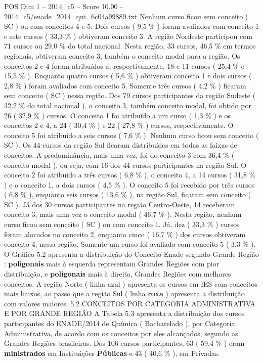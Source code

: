 \begin{textsample}{POS Dim 1 – 2014\_c5 – Score 10.00 – 2014\_c5/enade\_2014\_qui\_6c04a99889.txt}
Nenhum curso ficou sem conceito ( SC ) ou com conceitos 4 e 5.
Dois cursos ( 9,5 \% ) foram avaliados com conceito 1 e sete cursos ( 33,3 \% ) obtiveram conceito 3.
A região Nordeste participou com 71 cursos ou 29,0 \% do total nacional.
Nesta região, 33 cursos, 46,5 \% em termos regionais, obtiveram conceito 3, também o conceito modal para a região.
Os conceitos 2 e 4 foram atribuídos a, respectivamente, 18 e 11 cursos ( 25,4 \% e 15,5 \% ).
Enquanto quatro cursos ( 5,6 \% ) obtiveram conceito 1 e dois cursos ( 2,8 \% ) foram avaliados com conceito 5.
Somente três cursos ( 4,2 \% ) ficaram sem conceito ( SC ) nessa região.
Dos 79 cursos participantes da região Sudeste ( 32,2 \% do total nacional ), o conceito 3, também conceito modal, foi obtido por 26 ( 32,9 \% ) cursos.
O conceito 1 foi atribuído a um curso ( 1,3 \% ) e os conceitos 2 e 4, a 24 ( 30,4 \% ) e 22 ( 27,8 \% ) cursos, respectivamente.
O conceito 5 foi atribuído a seis cursos ( 7,6 \% ).
Nenhum curso ficou sem conceito ( SC ).
Os 44 cursos da região Sul ficaram distribuídos em todas as faixas de conceitos.
A predominância, mais uma vez, foi do conceito 3 com 36,4 \% ( conceito modal ), ou seja, com 16 dos 44 cursos participantes na região Sul.
O conceito 2 foi atribuído a três cursos ( 6,8 \% ), o conceito 4, a 14 cursos ( 31,8 \% ) e o conceito 1, a dois cursos ( 4,5 \% ).
O conceito 5 foi recebido por três cursos ( 6,8 \% ), enquanto seis cursos ( 13,6 \% ), na região Sul, ficaram sem conceito ( SC ).
Já dos 30 cursos participantes na região Centro-Oeste, 14 receberam conceito 3, mais uma vez o conceito modal ( 46,7 \% ).
Nesta região, nenhum curso ficou sem conceito ( SC ) ou com conceito 1.
Já, dez ( 33,3 \% ) cursos foram alocados no conceito 2, enquanto cinco ( 16,7 \% ) dos cursos obtiveram conceito 4, nessa região.
Somente um curso foi avaliado com conceito 5 ( 3,3 \% ).
O Gráfico 5.2 apresenta a distribuição do Conceito Enade segundo Grande Região : \textbf{poligonais} mais à esquerda representam Grandes Regiões com pior distribuição, e \textbf{poligonais} mais à direita, Grandes Regiões com melhores conceitos.
A região Norte ( linha azul ) apresenta os cursos em IES com conceitos mais baixos, ao passo que a região Sul ( linha \textbf{roxa} ) apresenta a distribuição com valores maiores. 5.2 CONCEITOS POR CATEGORIA ADMINISTRATIVA E POR GRANDE REGIÃO A Tabela 5.3 apresenta a distribuição dos cursos participantes do ENADE/2014 de Química ( Bacharelado ), por Categoria Administrativa, de acordo com os conceitos por eles alcançados, segundo as Grandes Regiões brasileiras.
Dos 106 cursos participantes, 63 ( 59,4 \% ) eram \textbf{ministrados} em Instituições \textbf{Públicas} e 43 ( 40,6 \% ), em Privadas.

\end{textsample}
